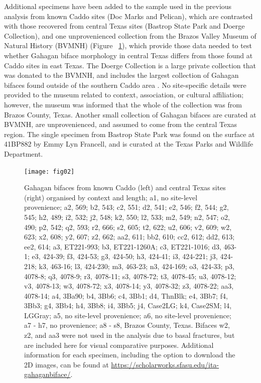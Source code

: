 \documentclass[review]{elsarticle}
\begin{document}
Additional specimens have been added to the sample used in the previous analysis from known Caddo sites (Doc Marks and Pelican), which are contrasted with those recovered from central Texas sites (Bastrop State Park and Doerge Collection), and one unprovenienced collection from the Brazos Valley Museum of Natural History (BVMNH) (Figure ~\ref{fig:fig2}), which provide those data needed to test whether Gahagan biface morphology in central Texas differs from those found at Caddo sites in east Texas. The Doerge Collection is a large private collection that was donated to the BVMNH, and includes the largest collection of Gahagan bifaces found outside of the southern Caddo area \citep[Table 5]{RN4924}. No site-specific details were provided to the museum related to context, association, or cultural affiliation; however, the museum was informed that the whole of the collection was from Brazos County, Texas. Another small collection of Gahagan bifaces are curated at BVMNH, are unprovenienced, and assumed to come from the central Texas region. The single specimen from Bastrop State Park was found on the surface at 41BP882 by Emmy Lyn Francell, and is curated at the Texas Parks and Wildlife Department.

\begin{figure}[htbp]\centering
\texttt{[image: fig02]}
\caption{Gahagan bifaces from known Caddo (left) and central Texas sites (right) organised by context and length; a1, no site-level provenience; a2, 569; b2, 543; c2, 551; d2, 541; e2, 546; f2, 544; g2, 545; h2, 489; i2, 532; j2, 548; k2, 550; l2, 533; m2, 549; n2, 547; o2, 490; p2, 542; q2, 593; r2, 666; s2, 605; t2, 622; u2, 606; v2, 609; w2, 623; x2, 608; y2, 607; z2, 662; aa2, 611; bb2, 610; cc2, 612; dd2, 613; ee2, 614; a3, ET221-993; b3, ET221-1260A; c3, ET221-1016; d3, 463-1; e3, 424-39; f3, 424-53; g3, 424-50; h3, 424-41; i3, 424-221; j3, 424-218; k3, 463-16; l3, 424-230; m3, 463-23; n3, 424-169; o3, 424-33; p3, 4078-8; q3, 4078-9; r3, 4078-11; s3, 4078-72; t3, 4078-45; u3, 4078-12; v3, 4078-13; w3, 4078-72; x3, 4078-14; y3, 4078-32; z3, 4078-22; aa3, 4078-14; a4, 3Ba90; b4, 3Bb6; c4, 3Bb1; d4, ThnBlk; e4, 3Bb7; f4, 3Bb3; g4, 3Bb4; h4, 3Bb8; i4, 3Bb5; j4, Case2LG; k4, Case2SM; l4, LGGray; a5, no site-level provenience; a6, no site-level provenience; a7 - h7, no provenience; a8 - s8, Brazos County, Texas. Bifaces w2, z2, and aa3 were not used in the analysis due to basal fractures, but are included here for visual comparative purposes. Additional information for each specimen, including the option to download the 2D images, can be found at \href{https://scholarworks.sfasu.edu/ita-gahaganbiface/}{https://scholarworks.sfasu.edu/ita-gahaganbiface/}.}
\label{fig:fig2}
\end{figure}
\end{document}
